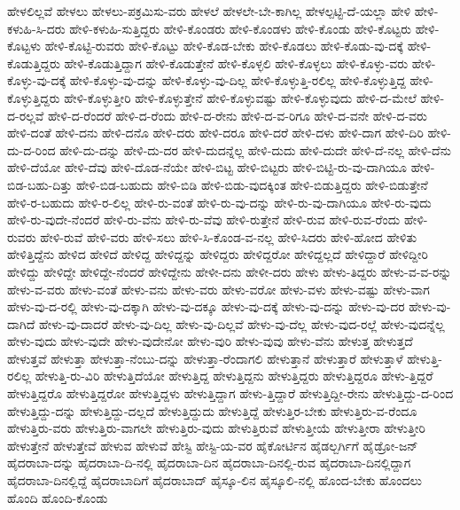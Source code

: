 {ಹೇಳಲಿಲ್ಲವೆ
ಹೇಳಲು
ಹೇಳಲು-ಪಕ್ರಮಿಸು-ವರು
ಹೇಳಲೆ
ಹೇಳಲೇ-ಬೇ-ಕಾಗಿಲ್ಲ
ಹೇಳಲ್ಪಟ್ಟಿ-ದೆ-ಯಲ್ಲಾ
ಹೇಳಿ
ಹೇಳಿ-ಕಳುಹಿ-ಸಿ-ದರು
ಹೇಳಿ-ಕಳುಹಿ-ಸುತ್ತಿದ್ದರು
ಹೇಳಿ-ಕೊಂಡರು
ಹೇಳಿ-ಕೊಂಡಳು
ಹೇಳಿ-ಕೊಂಡು
ಹೇಳಿ-ಕೊಟ್ಟರು
ಹೇಳಿ-ಕೊಟ್ಟಳು
ಹೇಳಿ-ಕೊಟ್ಟಿ-ರುವರು
ಹೇಳಿ-ಕೊಟ್ಟು
ಹೇಳಿ-ಕೊಡ-ಬೇಕು
ಹೇಳಿ-ಕೊಡಲು
ಹೇಳಿ-ಕೊಡು-ವು-ದಕ್ಕೆ
ಹೇಳಿ-ಕೊಡುತ್ತಿದ್ದರು
ಹೇಳಿ-ಕೊಡುತ್ತಿದ್ದಾಗ
ಹೇಳಿ-ಕೊಡುತ್ತೇನೆ
ಹೇಳಿ-ಕೊಳ್ಳಲಿ
ಹೇಳಿ-ಕೊಳ್ಳಲು
ಹೇಳಿ-ಕೊಳ್ಳು-ವರು
ಹೇಳಿ-ಕೊಳ್ಳು-ವು-ದಕ್ಕೆ
ಹೇಳಿ-ಕೊಳ್ಳು-ವು-ದನ್ನು
ಹೇಳಿ-ಕೊಳ್ಳು-ವು-ದಿಲ್ಲ
ಹೇಳಿ-ಕೊಳ್ಳುತ್ತಿ-ರಲಿಲ್ಲ
ಹೇಳಿ-ಕೊಳ್ಳುತ್ತಿದ್ದ
ಹೇಳಿ-ಕೊಳ್ಳುತ್ತಿದ್ದರು
ಹೇಳಿ-ಕೊಳ್ಳುತ್ತೀರಿ
ಹೇಳಿ-ಕೊಳ್ಳುತ್ತೇನೆ
ಹೇಳಿ-ಕೊಳ್ಳುವಷ್ಟು
ಹೇಳಿ-ಕೊಳ್ಳುವುದು
ಹೇಳಿ-ದ-ಮೇಲೆ
ಹೇಳಿ-ದ-ರಲ್ಲವೆ
ಹೇಳಿ-ದ-ರೆಂದರೆ
ಹೇಳಿ-ದ-ರೆಂದು
ಹೇಳಿ-ದ-ರೇನು
ಹೇಳಿ-ದ-ವ-ರಿಗೂ
ಹೇಳಿ-ದ-ವನೇ
ಹೇಳಿ-ದ-ವರು
ಹೇಳಿ-ದಂತೆ
ಹೇಳಿ-ದನು
ಹೇಳಿ-ದನೊ
ಹೇಳಿ-ದರು
ಹೇಳಿ-ದರೂ
ಹೇಳಿ-ದರೆ
ಹೇಳಿ-ದಳು
ಹೇಳಿ-ದಾಗ
ಹೇಳಿ-ದಿರಿ
ಹೇಳಿ-ದು-ದ-ರಿಂದ
ಹೇಳಿ-ದು-ದನ್ನು
ಹೇಳಿ-ದು-ದರ
ಹೇಳಿ-ದುದನ್ನೆಲ್ಲ
ಹೇಳಿ-ದುದು
ಹೇಳಿ-ದುದೇ
ಹೇಳಿ-ದೆ-ನಲ್ಲ
ಹೇಳಿ-ದೆನು
ಹೇಳಿ-ದೆಯೋ
ಹೇಳಿ-ದೆವು
ಹೇಳಿ-ದೊಡ-ನೆಯೇ
ಹೇಳಿ-ಬಿಟ್ಟ
ಹೇಳಿ-ಬಿಟ್ಟರು
ಹೇಳಿ-ಬಿಟ್ಟಿ-ರು-ವು-ದಾಗಿಯೂ
ಹೇಳಿ-ಬಿಡ-ಬಹು-ದಿತ್ತು
ಹೇಳಿ-ಬಿಡ-ಬಹುದು
ಹೇಳಿ-ಬಿಡಿ
ಹೇಳಿ-ಬಿಡು-ವುದಕ್ಕಿಂತ
ಹೇಳಿ-ಬಿಡುತ್ತಿದ್ದರು
ಹೇಳಿ-ಬಿಡುತ್ತೇನೆ
ಹೇಳಿ-ರ-ಬಹುದು
ಹೇಳಿ-ರ-ಲಿಲ್ಲ
ಹೇಳಿ-ರು-ವಂತೆ
ಹೇಳಿ-ರು-ವು-ದನ್ನು
ಹೇಳಿ-ರು-ವು-ದಾಗಿಯೂ
ಹೇಳಿ-ರು-ವುದು
ಹೇಳಿ-ರು-ವುದೇ-ನೆಂದರೆ
ಹೇಳಿ-ರು-ವೆನು
ಹೇಳಿ-ರು-ವೆವು
ಹೇಳಿ-ರುತ್ತೇನೆ
ಹೇಳಿ-ರುವ
ಹೇಳಿ-ರುವ-ರೆಂದು
ಹೇಳಿ-ರುವರು
ಹೇಳಿ-ರುವೆ
ಹೇಳಿ-ವರು
ಹೇಳಿ-ಸಲು
ಹೇಳಿ-ಸಿ-ಕೊಂಡ-ವ-ನಲ್ಲ
ಹೇಳಿ-ಸಿದರು
ಹೇಳಿ-ಹೋದ
ಹೇಳಿತು
ಹೇಳಿತ್ತಿದ್ದೆನು
ಹೇಳಿದ
ಹೇಳಿದೆ
ಹೇಳಿದ್ದ
ಹೇಳಿದ್ದನ್ನು
ಹೇಳಿದ್ದರು
ಹೇಳಿದ್ದರೋ
ಹೇಳಿದ್ದಲ್ಲದೆ
ಹೇಳಿದ್ದಾರೆ
ಹೇಳಿದ್ದೀರಿ
ಹೇಳಿದ್ದು
ಹೇಳಿದ್ದೇ
ಹೇಳಿದ್ದೇ-ನೆಂದರೆ
ಹೇಳಿದ್ದೇನು
ಹೇಳೀ-ದನು
ಹೇಳೀ-ದರು
ಹೇಳು
ಹೇಳು-ತಿದ್ದರು
ಹೇಳು-ವ-ವ-ರನ್ನು
ಹೇಳು-ವ-ವರು
ಹೇಳು-ವಂತೆ
ಹೇಳು-ವನು
ಹೇಳು-ವರು
ಹೇಳು-ವರೋ
ಹೇಳು-ವಳು
ಹೇಳು-ವಷ್ಟು
ಹೇಳು-ವಾಗ
ಹೇಳು-ವು-ದ-ರಲ್ಲಿ
ಹೇಳು-ವು-ದಕ್ಕಾಗಿ
ಹೇಳು-ವು-ದಕ್ಕೂ
ಹೇಳು-ವು-ದಕ್ಕೆ
ಹೇಳು-ವು-ದನ್ನು
ಹೇಳು-ವು-ದರ
ಹೇಳು-ವು-ದಾಗಿದೆ
ಹೇಳು-ವು-ದಾದರೆ
ಹೇಳು-ವು-ದಿಲ್ಲ
ಹೇಳು-ವು-ದಿಲ್ಲವೆ
ಹೇಳು-ವು-ದೆಲ್ಲ
ಹೇಳು-ವುದ-ರಲ್ಲೆ
ಹೇಳು-ವುದನ್ನೆಲ್ಲ
ಹೇಳು-ವುದು
ಹೇಳು-ವುದೇ
ಹೇಳು-ವುದೇನೋ
ಹೇಳು-ವುರಿ
ಹೇಳು-ವುವು
ಹೇಳು-ವೆನು
ಹೇಳುತ್ತ
ಹೇಳುತ್ತದೆ
ಹೇಳುತ್ತವೆ
ಹೇಳುತ್ತಾ
ಹೇಳುತ್ತಾ-ನೆಂಬು-ದನ್ನು
ಹೇಳುತ್ತಾ-ರೆಂದಾಗಲಿ
ಹೇಳುತ್ತಾನೆ
ಹೇಳುತ್ತಾರೆ
ಹೇಳುತ್ತಾಳೆ
ಹೇಳುತ್ತಿ-ರಲಿಲ್ಲ
ಹೇಳುತ್ತಿ-ರು-ವಿರಿ
ಹೇಳುತ್ತಿದೆಯೋ
ಹೇಳುತ್ತಿದ್ದ
ಹೇಳುತ್ತಿದ್ದನು
ಹೇಳುತ್ತಿದ್ದರು
ಹೇಳುತ್ತಿದ್ದರೂ
ಹೇಳು-ತ್ತಿದ್ದರೆ
ಹೇಳುತ್ತಿದ್ದರೊ
ಹೇಳುತ್ತಿದ್ದರೋ
ಹೇಳುತ್ತಿದ್ದಳು
ಹೇಳುತ್ತಿದ್ದಾಗ
ಹೇಳು-ತ್ತಿದ್ದಾರೆ
ಹೇಳುತ್ತಿದ್ದೀ-ರೇನು
ಹೇಳುತ್ತಿದ್ದು-ದ-ರಿಂದ
ಹೇಳುತ್ತಿದ್ದು-ದನ್ನು
ಹೇಳುತ್ತಿದ್ದು-ದಲ್ಲದೆ
ಹೇಳುತ್ತಿದ್ದುದು
ಹೇಳುತ್ತಿದ್ದೆ
ಹೇಳುತ್ತಿರ-ಬೇಕು
ಹೇಳುತ್ತಿರು-ವ-ರೆಂದೂ
ಹೇಳುತ್ತಿರು-ವರು
ಹೇಳುತ್ತಿರು-ವಾಗಲೇ
ಹೇಳುತ್ತಿರು-ವುದು
ಹೇಳುತ್ತಿರುವೆ
ಹೇಳುತ್ತೀಯೆ
ಹೇಳುತ್ತೀರಾ
ಹೇಳುತ್ತೀರಿ
ಹೇಳುತ್ತೇನೆ
ಹೇಳುತ್ತೇವೆ
ಹೇಳುವ
ಹೇಳುವೆ
ಹೇಸ್ಟಿ
ಹೇಸ್ಟಿ-ಯ-ವರ
ಹೈಕೋರ್ಟಿನ
ಹೈಡಲ್ಬರ್ಗಿಗೆ
ಹೈಡ್ರೋ-ಜನ್
ಹೈದರಾಬಾ-ದನ್ನು
ಹೈದರಾಬಾ-ದಿ-ನಲ್ಲಿ
ಹೈದರಾಬಾ-ದಿನ
ಹೈದರಾಬಾ-ದಿನಲ್ಲಿ-ರುವ
ಹೈದರಾಬಾ-ದಿನಲ್ಲಿದ್ದಾಗ
ಹೈದರಾಬಾ-ದಿನಲ್ಲಿದ್ದೆ
ಹೈದರಾಬಾದಿಗೆ
ಹೈದರಾಬಾದ್
ಹೈಸ್ಕೂ-ಲಿನ
ಹೈಸ್ಕೂಲಿ-ನಲ್ಲಿ
ಹೊಂದ-ಬೇಕು
ಹೊಂದಲು
ಹೊಂದಿ
ಹೊಂದಿ-ಕೊಂಡು
}
